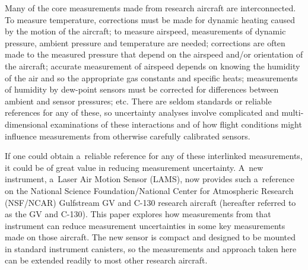 \documentclass[amtd, online, hvmath]{copernicus}
\begin{document}
\introduction

Many of the core measurements made from research aircraft are
interconnected.  To measure temperature, corrections must be made for
dynamic heating caused by the motion of the aircraft; to measure
airspeed, measurements of dynamic pressure, ambient pressure and
temperature are needed; corrections are often made to the measured
pressure that depend on the airspeed and/or orientation of the
aircraft; accurate measurement of airspeed depends on knowing the
humidity of the air and so the appropriate gas constants and specific
heats; measurements of humidity by dew-point sensors must be corrected
for differences between ambient and sensor pressures; etc. There are
seldom standards or reliable references for any of these, so
uncertainty analyses involve complicated and multi-dimensional
examinations of these interactions and of how flight conditions might
influence measurements from otherwise carefully calibrated sensors.

If one could obtain a~reliable reference for any of these interlinked
measurements, it could be of great value in reducing measurement
uncertainty.  A~new instrument, a~Laser Air Motion Sensor (LAMS), now
provides such a~reference on the National Science Foundation/National
Center for Atmospheric Research (NSF/NCAR) Gulfstream GV and C-130
research aircraft (hereafter referred to as the GV and C-130). This
paper explores how measurements from that instrument can reduce
measurement uncertainties in some key measurements made on those
aircraft. The new sensor is compact and designed to be mounted in
standard instrument canisters, so the measurements and approach taken
here can be extended readily to most other research aircraft.
\end{document}
